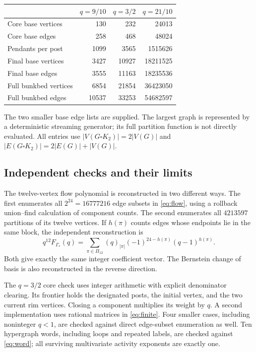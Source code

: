 \documentclass[11pt,a4paper]{article}
\theoremstyle{remark}\newtheorem{remark}[theorem]{Remark}
\begin{document}
\begin{center}
\begin{tabular}{lrrr}
\toprule
&$q=9/10$&$q=3/2$&$q=21/10$\\\midrule
Core base vertices&130&232&24013\\
Core base edges&258&468&48024\\
Pendants per post&1099&3565&1515626\\
Final base vertices&3427&10927&18211525\\
Final base edges&3555&11163&18235536\\
Full bunkbed vertices&6854&21854&36423050\\
Full bunkbed edges&10537&33253&54682597\\\bottomrule
\end{tabular}
\end{center}
The two smaller base edge lists are supplied. The largest graph is represented by a deterministic streaming generator; its full partition function is not directly evaluated. All entries use $|V(G\square K_2)|=2|V(G)|$ and $|E(G\square K_2)|=2|E(G)|+|V(G)|$.

\subsection{Independent checks and their limits}
The twelve-vertex flow polynomial is reconstructed in two different ways. The first enumerates all $2^{24}=16777216$ edge subsets in \eqref{eq:flow}, using a rollback union--find calculation of component counts. The second enumerates all $4213597$ partitions of its twelve vertices. If $h(\pi)$ counts edges whose endpoints lie in the same block, the independent reconstruction is
\begin{equation}\label{eq:partitionflow}
q^{12}F_{\Gamma_*}(q)=\sum_{\pi\in\Pi_{12}}(q)_{|\pi|}
(-1)^{24-h(\pi)}(q-1)^{h(\pi)}.
\end{equation}
Both give exactly the same integer coefficient vector. The Bernstein change of basis is also reconstructed in the reverse direction.

The $q=3/2$ core check uses integer arithmetic with explicit denominator clearing. Its frontier holds the designated posts, the initial vertex, and the two current rim vertices. Closing a component multiplies its weight by $q$. A second implementation uses rational matrices in \eqref{eq:finite}. Four smaller cases, including noninteger $q<1$, are checked against direct edge-subset enumeration as well. Ten hypergraph words, including loops and repeated labels, are checked against \eqref{eq:word}; all surviving multivariate activity exponents are exactly one.
\end{document}
